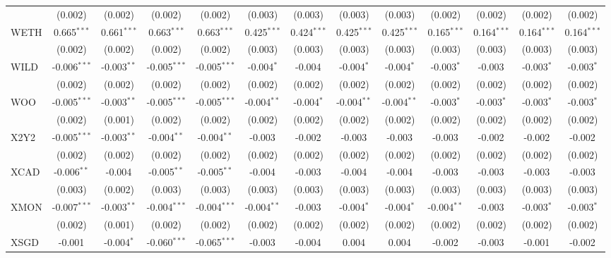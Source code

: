 \begin{table}[!htbp]
\begin{tabular}{@{\extracolsep{5pt}}lcccccccccccc}
  & (0.002) & (0.002) & (0.002) & (0.002) & (0.003) & (0.003) & (0.003) & (0.003) & (0.002) & (0.002) & (0.002) & (0.002) \\
 WETH & 0.665$^{***}$ & 0.661$^{***}$ & 0.663$^{***}$ & 0.663$^{***}$ & 0.425$^{***}$ & 0.424$^{***}$ & 0.425$^{***}$ & 0.425$^{***}$ & 0.165$^{***}$ & 0.164$^{***}$ & 0.164$^{***}$ & 0.164$^{***}$ \\
  & (0.002) & (0.002) & (0.002) & (0.002) & (0.003) & (0.003) & (0.003) & (0.003) & (0.003) & (0.003) & (0.003) & (0.003) \\
 WILD & -0.006$^{***}$ & -0.003$^{**}$ & -0.005$^{***}$ & -0.005$^{***}$ & -0.004$^{*}$ & -0.004$^{}$ & -0.004$^{*}$ & -0.004$^{*}$ & -0.003$^{*}$ & -0.003$^{}$ & -0.003$^{*}$ & -0.003$^{*}$ \\
  & (0.002) & (0.002) & (0.002) & (0.002) & (0.002) & (0.002) & (0.002) & (0.002) & (0.002) & (0.002) & (0.002) & (0.002) \\
 WOO & -0.005$^{***}$ & -0.003$^{**}$ & -0.005$^{***}$ & -0.005$^{***}$ & -0.004$^{**}$ & -0.004$^{*}$ & -0.004$^{**}$ & -0.004$^{**}$ & -0.003$^{*}$ & -0.003$^{*}$ & -0.003$^{*}$ & -0.003$^{*}$ \\
  & (0.002) & (0.001) & (0.002) & (0.002) & (0.002) & (0.002) & (0.002) & (0.002) & (0.002) & (0.002) & (0.002) & (0.002) \\
 X2Y2 & -0.005$^{***}$ & -0.003$^{**}$ & -0.004$^{**}$ & -0.004$^{**}$ & -0.003$^{}$ & -0.002$^{}$ & -0.003$^{}$ & -0.003$^{}$ & -0.003$^{}$ & -0.002$^{}$ & -0.002$^{}$ & -0.002$^{}$ \\
  & (0.002) & (0.002) & (0.002) & (0.002) & (0.002) & (0.002) & (0.002) & (0.002) & (0.002) & (0.002) & (0.002) & (0.002) \\
 XCAD & -0.006$^{**}$ & -0.004$^{}$ & -0.005$^{**}$ & -0.005$^{**}$ & -0.004$^{}$ & -0.003$^{}$ & -0.004$^{}$ & -0.004$^{}$ & -0.003$^{}$ & -0.003$^{}$ & -0.003$^{}$ & -0.003$^{}$ \\
  & (0.003) & (0.002) & (0.003) & (0.003) & (0.003) & (0.003) & (0.003) & (0.003) & (0.003) & (0.003) & (0.003) & (0.003) \\
 XMON & -0.007$^{***}$ & -0.003$^{**}$ & -0.004$^{***}$ & -0.004$^{***}$ & -0.004$^{**}$ & -0.003$^{}$ & -0.004$^{*}$ & -0.004$^{*}$ & -0.004$^{**}$ & -0.003$^{}$ & -0.003$^{*}$ & -0.003$^{*}$ \\
  & (0.002) & (0.001) & (0.002) & (0.002) & (0.002) & (0.002) & (0.002) & (0.002) & (0.002) & (0.002) & (0.002) & (0.002) \\
 XSGD & -0.001$^{}$ & -0.004$^{*}$ & -0.060$^{***}$ & -0.065$^{***}$ & -0.003$^{}$ & -0.004$^{}$ & 0.004$^{}$ & 0.004$^{}$ & -0.002$^{}$ & -0.003$^{}$ & -0.001$^{}$ & -0.002$^{}$ \\

\end{tabular}
\end{table}
